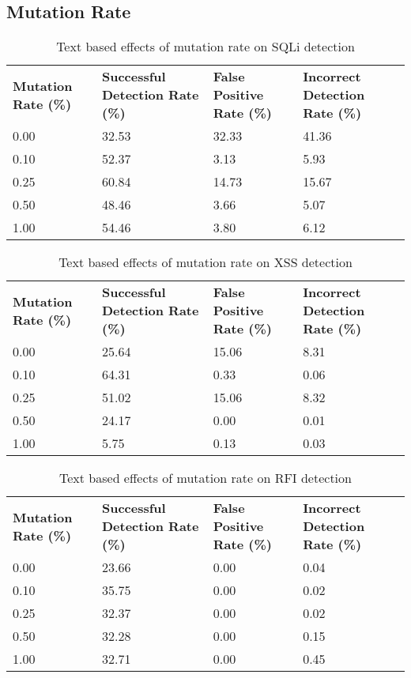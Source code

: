 \begin{appendices}
\newpage
\section{Mutation Rate}

\begin{table}[h]
	\centering
	\begin{tabular}{|p{1.5in}|p{1in}|p{1in}|p{1in}|}
	\hline
	\textbf{Mutation Rate (\%)} & \textbf{Successful Detection Rate (\%)} & \textbf{False Positive Rate (\%)} & \textbf{Incorrect Detection Rate (\%)}  \\
	\hhline{|=|=|=|=|}
	0.00 & 32.53 & 32.33 & 41.36 \\
	\hline
	0.10 & 52.37 & 3.13 & 5.93 \\
	\hline
	0.25 & 60.84 & 14.73 & 15.67 \\
	\hline
	0.50 & 48.46 & 3.66 & 5.07 \\
	\hline
	1.00 & 54.46 & 3.80 & 6.12 \\
	\hline
	\end{tabular}
	\caption[]{Text based effects of mutation rate on SQLi detection}
	\label{app:sqlMutationText}
\end{table}

\begin{table}[h]
	\centering
	\begin{tabular}{|p{1.5in}|p{1in}|p{1in}|p{1in}|}
	\hline
	\textbf{Mutation Rate (\%)} & \textbf{Successful Detection Rate (\%)} & \textbf{False Positive Rate (\%)} & \textbf{Incorrect Detection Rate (\%)}  \\
	\hhline{|=|=|=|=|}
	0.00 & 25.64 & 15.06 & 8.31 \\
	\hline
	0.10 & 64.31 & 0.33 & 0.06 \\
	\hline
	0.25 & 51.02 & 15.06 & 8.32 \\
	\hline
	0.50 & 24.17 & 0.00 & 0.01 \\
	\hline
	1.00 & 5.75 & 0.13 & 0.03 \\
	\hline
	\end{tabular}
	\caption[]{Text based effects of mutation rate on XSS detection}
	\label{app:xssMutationText}
\end{table}

\begin{table}[h]
	\centering
	\begin{tabular}{|p{1.5in}|p{1in}|p{1in}|p{1in}|}
	\hline
	\textbf{Mutation Rate (\%)} & \textbf{Successful Detection Rate (\%)} & \textbf{False Positive Rate (\%)} & \textbf{Incorrect Detection Rate (\%)}  \\
	\hhline{|=|=|=|=|}
	0.00 & 23.66 & 0.00 & 0.04 \\
	\hline
	0.10 & 35.75 & 0.00 & 0.02 \\
	\hline
	0.25 & 32.37 & 0.00 & 0.02 \\
	\hline
	0.50 & 32.28 & 0.00 & 0.15 \\
	\hline
	1.00 & 32.71 & 0.00 & 0.45 \\
	\hline
	\end{tabular}
	\caption[]{Text based effects of mutation rate on RFI detection}
	\label{app:rfiMutationText}
\end{table}


\end{appendices}

